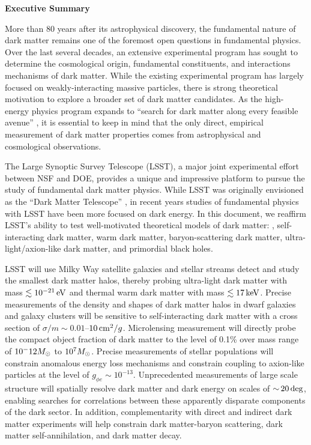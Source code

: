 \begin{center}
  {\Large \bf Executive Summary}
\end{center}

More than 80 years after its astrophysical discovery, the fundamental nature of dark matter remains one of the foremost open questions in fundamental physics.
Over the last several decades, an extensive experimental program has sought to determine the cosmological origin, fundamental constituents, and interactions mechanisms of dark matter. 
While the existing experimental program has largely focused on weakly-interacting massive particles, there is strong theoretical motivation to explore a broader set of dark matter candidates.
As the high-energy physics program expands to ``search for dark matter along every feasible avenue'' \citep{P5:2014}, it is essential to keep in mind that the only direct, empirical measurement of dark matter properties comes from astrophysical and cosmological observations.

The Large Synoptic Survey Telescope (LSST), a major joint experimental effort between NSF and DOE, provides a unique and impressive platform to pursue the study of fundamental dark matter physics.
While LSST was originally envisioned as the ``Dark Matter Telescope'' \citep{Tyson:2001}, in recent years studies of fundamental physics with LSST have been more focused on dark energy.
In this document, we reaffirm LSST's ability to test well-motivated theoretical models of dark matter: \ie, self-interacting dark matter, warm dark matter, baryon-scattering dark matter, ultra-light/axion-like dark matter, and primordial black holes. 

LSST will use Milky Way satellite galaxies and stellar streams detect and study the smallest dark matter halos, thereby probing ultra-light dark matter with mass $\lesssim 10^{-21}\mathrm{\,eV}$ and thermal warm dark matter with mass $\lesssim 17\mathrm{\,keV}$.
Precise measurements of the density and shapes of dark matter halos in dwarf galaxies and galaxy clusters will be sensitive to self-interacting dark matter with a cross section of $\sigma/m \sim 0.01$--$10 \mathrm{\,cm}^2/g$.
Microlensing measurement will directly probe the compact object fraction of dark matter to the level of 0.1\% over mass range of $10^-{12}M_\odot$ to $10^7M_\odot$.
Precise measurements of stellar populations will constrain anomalous energy loss mechanisms and constrain coupling to axion-like particles at the level of $g_{\phi e} \sim 10^{-13}$.
Unprecedented measurements of large scale structure will spatially resolve dark matter and dark energy on scales of $ {\sim}\, 20\mathrm{\,deg}$, enabling searches for correlations between these apparently disparate components of the dark sector.
In addition, complementarity with direct and indirect dark matter experiments will help constrain dark matter-baryon scattering, dark matter self-annihilation, and dark matter decay.

